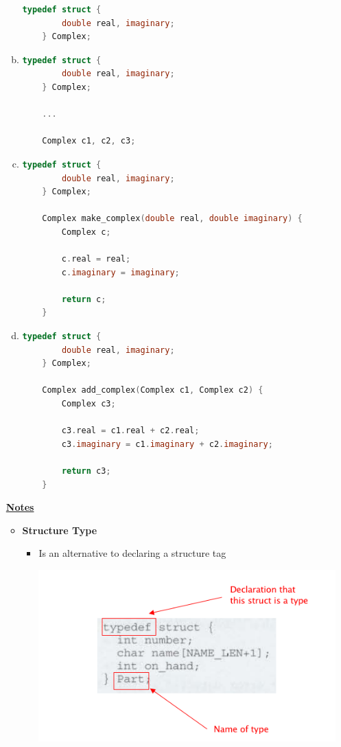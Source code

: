 \documentclass[12pt]{article}
\begin{document}
\begin{enumerate}[1.]
\begin{enumerate}[a)]
\begin{lstlisting}[language=c]
    typedef struct {
        double real, imaginary;
    } Complex;
\end{lstlisting}

        \item

\begin{lstlisting}[language=c]
    typedef struct {
        double real, imaginary;
    } Complex;

    ...

    Complex c1, c2, c3;
\end{lstlisting}

        \item

\begin{lstlisting}[language=c]
    typedef struct {
        double real, imaginary;
    } Complex;

    Complex make_complex(double real, double imaginary) {
        Complex c;

        c.real = real;
        c.imaginary = imaginary;

        return c;
    }
\end{lstlisting}

        \item

\begin{lstlisting}[language=c]
    typedef struct {
        double real, imaginary;
    } Complex;

    Complex add_complex(Complex c1, Complex c2) {
        Complex c3;

        c3.real = c1.real + c2.real;
        c3.imaginary = c1.imaginary + c2.imaginary;

        return c3;
    }
\end{lstlisting}
    \end{enumerate}

    \underline{\textbf{Notes}}

    \begin{itemize}
        \item \textbf{Structure Type}

        \begin{itemize}
            \item Is an alternative to declaring a structure tag

            \bigskip

            \begin{center}
            \includegraphics[width=0.5\linewidth]{images/review_7_solution_7.png}
            \end{center}


\end{itemize}
\end{itemize}
\end{enumerate}
\end{document}
